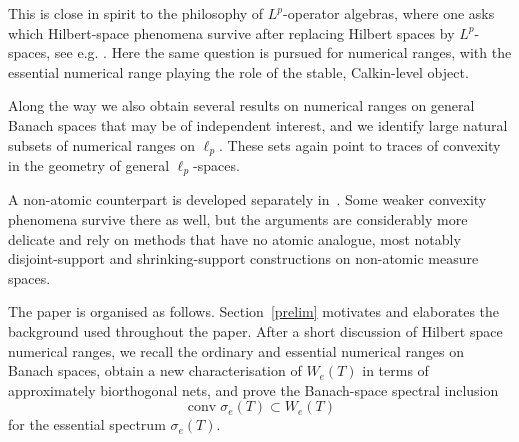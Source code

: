 \documentclass[11pt]{amsart}
\numberwithin{equation}{section}
\theoremstyle{definition}
\theoremstyle{remark}
\DeclareMathOperator{\conv}{conv}
\begin{document}


This is close in spirit to the philosophy of \(L^p\)-operator algebras, where one
asks which Hilbert-space phenomena survive after replacing Hilbert spaces by
\(L^p\)-spaces, see e.g. \cite{Blecher2019,Boedihardjo2024}. Here the same question is pursued for
numerical ranges, with the essential numerical range playing the role of the
stable, Calkin-level object.


Along the way we also obtain several results on numerical ranges on general Banach spaces that may be of independent interest, and we identify large natural subsets of numerical ranges on $\ell_p$. These sets again point to traces of convexity in the geometry of general $\ell_p$-spaces.

A non-atomic counterpart is developed separately in~\cite{MTnonatomic}. Some weaker convexity phenomena survive there as well, but the arguments are considerably more delicate and rely on methods that have no atomic analogue, most notably disjoint-support and shrinking-support constructions on non-atomic measure spaces.

The paper is organised as follows. Section~\ref{prelim} motivates and elaborates the
background used throughout the paper. After a short discussion of
Hilbert space numerical ranges, we recall the ordinary and essential numerical
ranges on Banach spaces, obtain a new characterisation of
\(W_e(T)\) in terms of approximately biorthogonal nets, and
prove the Banach-space spectral inclusion
\[
        \conv\sigma_e(T)\subset W_e(T)
\]
for the essential spectrum $\sigma_e(T).$
\end{document}

